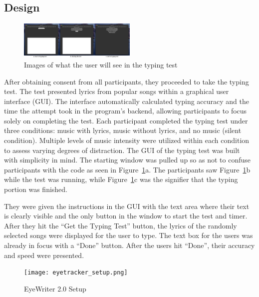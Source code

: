 \documentclass[manuscript, screen, review]{acmart} %
\begin{document}
\subsection[short]{Design}

\begin{figure}
  \includegraphics[width=0.5\textwidth]{typingTest}
  \caption{Images of what the user will see in the typing test}
  \label{typingTest}
\end{figure}

After obtaining consent from all participants, they proceeded to take the typing test. The test presented lyrics from popular songs within a graphical user interface (GUI). 
The interface automatically calculated typing accuracy and the time the attempt took in the program's backend, allowing participants to focus solely on completing the test.
Each participant completed the typing test under three conditions: music with lyrics, music without lyrics, and no music (silent condition).
Multiple levels of music intensity were utilized within each condition to assess varying degrees of distraction.
The GUI of the typing test was built with simplicity in mind. The starting window was pulled up so as not to confuse participants with the code as seen in Figure~\ref{typingTest}a. The participants saw Figure~\ref{typingTest}b while the test was running, while Figure~\ref{typingTest}c was the signifier that the typing portion was finished. 

They were given the instructions in the GUI with the text area where their text is clearly visible and the only button in the window to start the test and timer. 
After they hit the ``Get the Typing Test'' button, the lyrics of the randomly selected songs were displayed for the user to type. 
The text box for the users was already in focus with a ``Done'' button. After the users hit ``Done'', their accuracy and speed were presented.

\begin{figure}
  \center
  \texttt{[image: eyetracker\_setup.png]}
  \caption{EyeWriter 2.0 Setup}
  \label{EyeWriter}
\end{figure}
\end{document}
